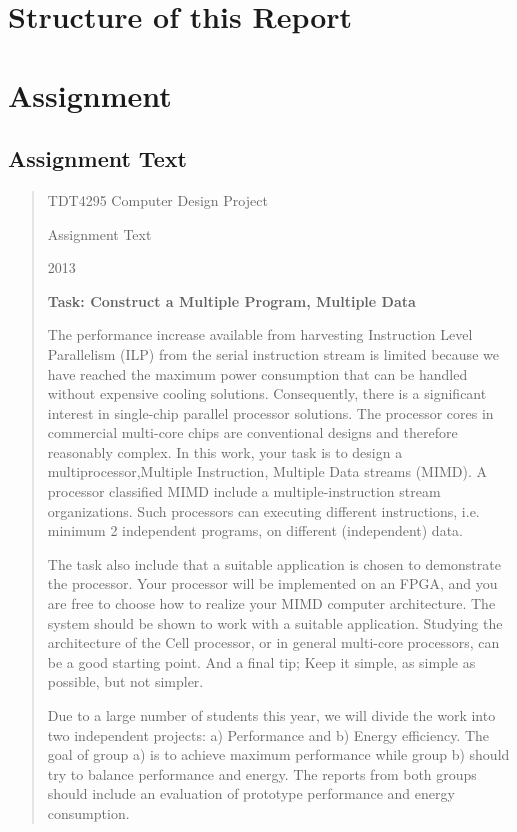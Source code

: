 
\section{Structure of this Report}

\section{Assignment}

\subsection{Assignment Text}

\begin{quote}

\begin{center}
TDT4295 Computer Design Project

Assignment Text

2013 
\end{center}
 
\textbf{Task: Construct a Multiple Program, Multiple Data}

The performance increase available from harvesting Instruction Level Parallelism (ILP) from the serial instruction stream is limited because we have reached the maximum power consumption that can be handled without expensive cooling solutions.
Consequently, there is a significant interest in single-chip parallel processor solutions.
The processor cores in commercial multi-core chips are conventional designs and therefore reasonably complex.
In this work, your task is to design a multiprocessor,Multiple Instruction, Multiple Data streams (MIMD).
A processor classified MIMD include a multiple-instruction stream organizations.
Such processors can executing different instructions, i.e. minimum 2 independent programs, on different (independent) data.

The task also include that a suitable application is chosen to demonstrate the processor.
Your processor will be implemented on an FPGA, and you are free to choose how to realize your MIMD computer architecture.
The system should be shown to work with a suitable application.
Studying the architecture of the Cell processor, or in general multi-core processors, can be a good starting point.
And a final tip; Keep it simple, as simple as possible, but not simpler.

Due to a large number of students this year, we will divide the work into two independent projects: a) Performance and b) Energy efficiency.
The goal of group a) is to achieve maximum performance while group b) should try to balance performance and energy.
The reports from both groups should include an evaluation of prototype performance and energy consumption.


\end{quote}
